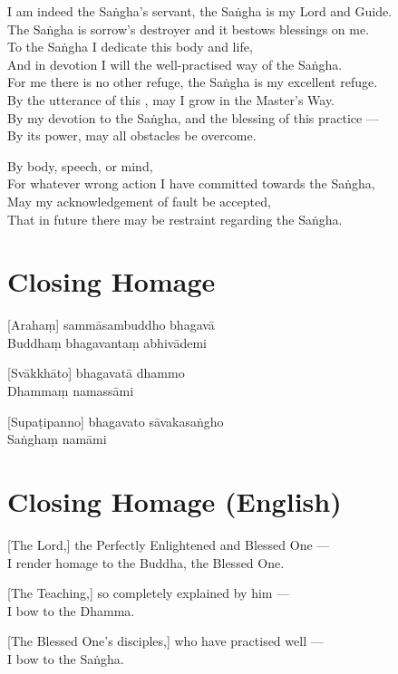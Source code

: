 I am indeed the Saṅgha's servant, the Saṅgha is my Lord and Guide.\\
The Saṅgha is sorrow's destroyer and it bestows blessings on me.\\
To the Saṅgha I dedicate this body and life,\\
And in devotion I will  the well-practised way of the Saṅgha.\\
For me there is no other refuge, the Saṅgha is my excellent refuge.\\
By the utterance of this , may I grow in the Master's Way.\\
By my devotion to the Saṅgha, and the blessing of this practice ---\\
By its power, may all obstacles be overcome.


By body, speech, or mind,\\
For whatever wrong action I have committed towards the Saṅgha,\\
May my acknowledgement of fault be accepted,\\
That in future there may be restraint regarding the Saṅgha.

\section*{Closing Homage}

[Arahaṃ] sammāsambuddho bhagavā\\
Buddhaṃ bhagavantaṃ abhivādemi

[Svākkhāto] bhagavatā dhammo\\
Dhammaṃ namassāmi

[Supaṭipanno] bhagavato sāvakasaṅgho\\
Saṅghaṃ namāmi

\section*{Closing Homage (English)}

[The Lord,] the Perfectly Enlightened and Blessed One ---\\
I render homage to the Buddha, the Blessed One. 

[The Teaching,] so completely explained by him ---\\
I bow to the Dhamma. 

[The Blessed One's disciples,] who have practised well ---\\
I bow to the Saṅgha. 

